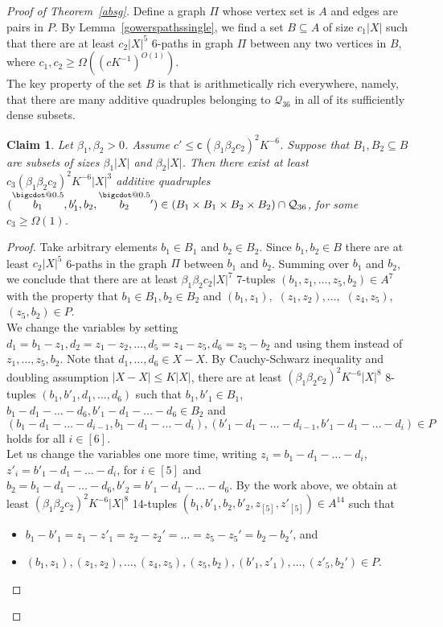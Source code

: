 \documentclass[a4paper,11pt]{article}
\makeatletter
\numberwithin{theorem}{section}
\newtheorem{claim}[theorem]{Claim}
\theoremstyle{definition}
\newcommand*\bcdot{\mathpalette\bigcdot@{0.5}}
\newcommand*\bigcdot@[2]{\mathbin{\vcenter{\hbox{\scalebox{#2}{$\m@th#1\bullet$}}}}}
\newcommand{\bsc}{\bm{\mathsf{c}}}
\newcommand{\upd}[1]{\overset{\bcdot}{#1}}
\makeatother
\begin{document}
\begin{proof}[Proof of Theorem~\ref{absg}]
    Define a graph $\Pi$ whose vertex set is $A$ and edges are pairs in $P$. By Lemma~\ref{gowerspathssingle}, we find a set $B \subseteq A$ of size $c_1 |X|$ such that there are at least $c_2|X|^5$ 6-paths in graph $\Pi$ between any two vertices in $B$, where $c_1, c_2 \geq \Omega((cK^{-1})^{O(1)})$.\\

    The key property of the set $B$ is that is arithmetically rich everywhere, namely, that there are many additive quadruples belonging to $\mathcal{Q}_{36}$ in all of its sufficiently dense subsets.

    \begin{claim}\label{absBSGarithrich}
        Let $\beta_1, \beta_2 > 0$. Assume $c' \leq \bsc\,(\beta_1 \beta_2 c_2)^2K^{-6}$. Suppose that $B_1, B_2 \subseteq B$ are subsets of sizes $\beta_1|X|$ and $\beta_2|X|$. Then there exist at least $c_3(\beta_1\beta_2c_2)^2 K^{-6}|X|^3$ additive quadruples $(\upd{b_1}, b'_1, b_2, \upd{b_2} {}') \in (B_1 \times B_1 \times B_2 \times B_2) \cap \mathcal{Q}_{36}$, for some $c_3 \geq \Omega(1)$.
    \end{claim}

    \begin{proof}
        Take arbitrary elements $b_1 \in B_1$ and $b_2 \in B_2$. Since $b_1, b_2 \in B$ there are at least $c_2|X|^5$ 6-paths in the graph $\Pi$ between $b_1$ and $b_2$. Summing over $b_1$ and $b_2$, we conclude that there are at least $\beta_1 \beta_2 c_2|X|^7$ 7-tuples $(b_1, z_1, \dots, z_5, b_2) \in A^7$ with the property that $b_1 \in B_1, b_2 \in B_2$ and $(b_1, z_1),$ $(z_1, z_2), \dots,$ $(z_4, z_5),$ $(z_5, b_2) \in P$.\\

        We change the variables by setting $d_1 = b_1 - z_1, d_2 = z_1 - z_2, \dots, d_5 = z_4 - z_5, d_6 = z_5 - b_2$ and using them instead of $z_1, \dots, z_5, b_2$. Note that $d_1, \dots, d_6 \in X - X$. By Cauchy-Schwarz inequality and doubling assumption $|X - X| \leq K |X|$, there are at least $(\beta_1 \beta_2 c_2)^2K^{-6}|X|^8$ 8-tuples $(b_1, b'_1, d_1, \dots, d_6)$ such that $b_1, b'_1 \in B_1$, $b_1 - d_1 - \dots - d_6, b'_1 - d_1 - \dots - d_6 \in B_2$ and 
        \[(b_1 - d_1 - \dots - d_{i-1}, b_1 - d_1 - \dots - d_i), (b'_1 - d_1 - \dots - d_{i-1}, b'_1 - d_1 - \dots - d_i) \in P\]
        holds for all $i \in [6]$.\\

        Let us change the variables one more time, writing $z_i = b_1 - d_1 - \dots - d_i$, $z'_i = b'_1 - d_1 - \dots - d_i$, for $i \in [5]$ and $b_2 = b_1 - d_1 - \dots - d_6, b'_2 = b'_1 - d_1 - \dots - d_6$. By the work above, we obtain at least $(\beta_1 \beta_2 c_2)^2K^{-6}|X|^8$ 14-tuples $(b_1, b'_1, b_2, b'_2, z_{[5]}, z'_{[5]}) \in A^{14}$ such that 
        \begin{itemize}
            \item $b_1 - b'_1 = z_1 - z'_1 = z_2 - z_2'= \dots = z_5 - z_5' = b_2 - b_2'$, and
            \item $(b_1, z_1), (z_1, z_2), \dots, (z_4, z_5), (z_5, b_2), (b'_1, z'_1), \dots, (z'_5,b_2') \in P$.
        \end{itemize}


\end{proof}
\end{proof}
\end{document}
